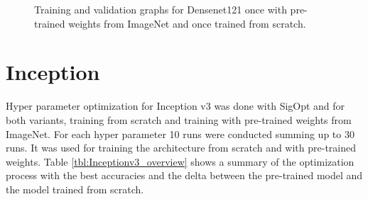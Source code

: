 \begin{figure}[!h]
\centering
\caption{Training and validation graphs for Densenet121 once with pre-trained weights from ImageNet and once trained from scratch.}
\label{fig:densenet121-graph}
\end{figure}

\quad










\section{Inception}


Hyper parameter optimization for Inception v3 was done with SigOpt and for both variants, training from scratch and training with pre-trained weights from ImageNet. For each hyper parameter 10 runs were conducted summing up to 30 runs. It was used for training the architecture from scratch and with pre-trained weights. Table \ref{tbl:Inceptionv3_overview} shows a summary of the optimization process with the best accuracies and the delta between the pre-trained model and the model trained from scratch. \\


